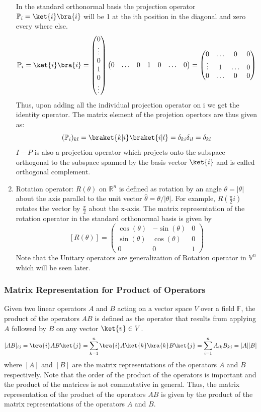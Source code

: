 \documentclass[12pt, oneside]{book}
\theoremstyle{definition}
\theoremstyle{definition}
\theoremstyle{remark}
\begin{document}
\begin{enumerate}
    In the standard orthonormal basis the projection operator $\mathbb{P}_i=\ket{i}\bra{i}$ will be 1 at the ith position in the diagonal and zero every where else. 
    \[\mathbb{P}_i= \ket{i}\bra{i} = \begin{pmatrix} 0 \\ \vdots \\ 0 \\ 1 \\0 \\ \vdots \end{pmatrix} \begin{pmatrix} 0 & \ldots & 0 & 1 & 0 & \ldots & 0 \end{pmatrix} = \begin{pmatrix} 0 & \ldots & 0 & 0 \\ \vdots & 1 & \ldots & 0 \\ 0 & \ldots & 0 & 0 \end{pmatrix}\]
    Thus, 
    upon adding all the individual projection operator on i we get the identity operator. The matrix element of the projetion opertors are thus given as:
    \[(\mathbb{P}_i)_{kl}=\braket{k|i}\braket{i|l}=\delta_{ki}\delta_{il}=\delta_{kl} \]
    $I-P$ is also a projection operator which projects onto the subspace orthogonal to the subspace spanned by the basis vector $\ket{i}$ and is called orthogonal complement.
    \item Rotation operator: $R(\theta)$ on $\mathbb{R}^n$ is defined as rotation by an angle $\theta = |\theta|$ about the axis parallel
    to the unit vector $\hat{\theta}=\theta/|\theta|$. For example, $R(\frac{\pi}{2} i)$ rotates the vector by $\frac{\pi}{2}$ about the x-axis. The matrix representation of the rotation operator in the standard orthonormal basis is given by
    \[ [R(\theta)]=\begin{pmatrix} \cos(\theta) & -\sin(\theta) & 0 \\ \sin(\theta) & \cos(\theta) & 0 \\ 0 & 0 & 1 \end{pmatrix} \]
    Note that the Unitary operators are generalization of Rotation operator in $\mathbb{V}^n$ which will be seen later.
\end{enumerate}

\subsubsection{Matrix Representation for Product of Operators}
Given two linear operators $A$ and $B$ acting on a vector space $V$ over a field $\mathbb{F}$, the product of the operators $AB$ is defined as the operator that results from applying $A$ followed by $B$ on any vector $\ket{v}\in V$.
\[[AB]_{ij}=\bra{i}AB\ket{j}=\sum_{k=1}^n \bra{i}A\ket{k}\bra{k}B\ket{j}=\sum_{i=1}^n A_{ik}B_{kj}=[A][B]\]
where $[A]$ and $[B]$ are the matrix representations of the operators $A$ and $B$ respectively. Note that the order of the product of the operators is important and the product of the matrices is not commutative in general. 
Thus, the matrix representation of the product of the operators $AB$ is given by the product of the matrix representations of the operators $A$ and $B$.
\end{document}
